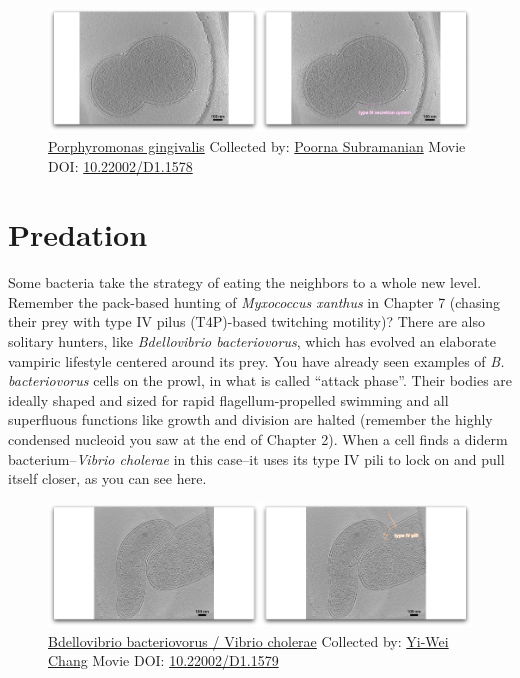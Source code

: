 \documentclass[]{tufte-book}
\begin{document}
\begin{figure}
\includegraphics{movie_stills/9_8} \caption[\protect\hyperlink{tree}{Porphyromonas gingivalis} Collected
by: \protect\hyperlink{poorna_subramanian}{Poorna Subramanian} Movie
DOI: \href{https://doi.org/10.22002/D1.1578}{10.22002/D1.1578}]{\protect\hyperlink{tree}{Porphyromonas gingivalis} Collected
by: \protect\hyperlink{poorna_subramanian}{Poorna Subramanian} Movie
DOI: \href{https://doi.org/10.22002/D1.1578}{10.22002/D1.1578}}\label{fig:9-8}
\end{figure}

\section{Predation}\label{predation}

Some bacteria take the strategy of eating the neighbors to a whole new
level. Remember the pack-based hunting of \emph{Myxococcus xanthus} in
Chapter 7 (chasing their prey with type IV pilus (T4P)-based twitching
motility)? There are also solitary hunters, like \emph{Bdellovibrio
bacteriovorus}, which has evolved an elaborate vampiric lifestyle
centered around its prey. You have already seen examples of \emph{B.
bacteriovorus} cells on the prowl, in what is called ``attack phase''.
Their bodies are ideally shaped and sized for rapid flagellum-propelled
swimming and all superfluous functions like growth and division are
halted (remember the highly condensed nucleoid you saw at the end of
Chapter 2). When a cell finds a diderm bacterium--\emph{Vibrio cholerae}
in this case--it uses its type IV pili to lock on and pull itself
closer, as you can see here.





\begin{figure}
\includegraphics{movie_stills/9_9} \caption[\protect\hyperlink{tree}{Bdellovibrio bacteriovorus / Vibrio
cholerae} Collected by: \protect\hyperlink{yi-wei_chang}{Yi-Wei Chang}
Movie DOI: \href{https://doi.org/10.22002/D1.1579}{10.22002/D1.1579}]{\protect\hyperlink{tree}{Bdellovibrio bacteriovorus / Vibrio
cholerae} Collected by: \protect\hyperlink{yi-wei_chang}{Yi-Wei Chang}
Movie DOI: \href{https://doi.org/10.22002/D1.1579}{10.22002/D1.1579}}\label{fig:9-9}
\end{figure}
\end{document}
